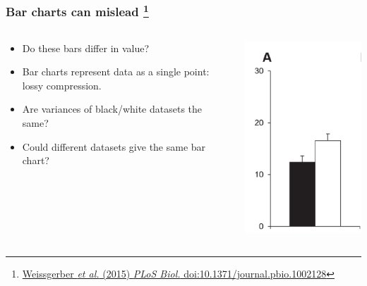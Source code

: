\begin{frame}
  \frametitle{Bar charts can mislead
  \footnote{\tiny{\href{http://dx.doi.org/10.1371/journal.pbio.1002128}{Weissgerber \textit{et al.} (2015) \textit{PLoS Biol.} doi:10.1371/journal.pbio.1002128}}}
  }
  \begin{columns}[T]
    \begin{column}{6cm}  
      \begin{itemize}  
        \item \textcolor{hutton_green}{Do these bars differ in value?}
        \item Bar charts represent data as a single point: lossy compression.
        \item \textcolor{hutton_blue}{Are variances of black/white datasets the same?}
        \item \textcolor{hutton_purple}{Could different datasets give the same bar chart?}
      \end{itemize}  
    \end{column}
    \begin{column}{4cm}  
      \includegraphics[width=1\textwidth]{images/weissgerber1}    
    \end{column}
  \end{columns}   
\end{frame}

